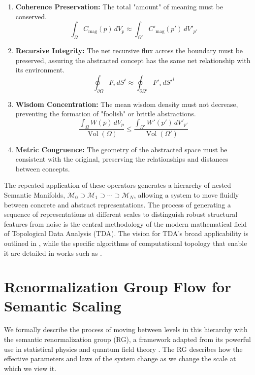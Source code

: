 \begin{enumerate}
    \item \textbf{Coherence Preservation:} The total "amount" of meaning must be conserved.
    \begin{equation}
    \int_{\Omega} C_{\text{mag}}(p) \, dV_p \approx \int_{\Omega'} C'_{\text{mag}}(p') \, dV'_{p'}
    \end{equation}
    \item \textbf{Recursive Integrity:} The net recursive flux across the boundary must be preserved, assuring the abstracted concept has the same net relationship with its environment.
    \begin{equation}
    \oint_{\partial \Omega} F_i \, dS^i \approx \oint_{\partial \Omega'} F'_i \, dS'^i
    \end{equation}
    \item \textbf{Wisdom Concentration:} The mean wisdom density must not decrease, preventing the formation of "foolish" or brittle abstractions.
    \begin{equation}
    \frac{\int_{\Omega} W(p) \, dV_p}{\operatorname{Vol}(\Omega)} \leq \frac{\int_{\Omega'} W'(p') \, dV'_{p'}}{\operatorname{Vol}(\Omega')}
    \end{equation}
    \item \textbf{Metric Congruence:} The geometry of the abstracted space must be consistent with the original, preserving the relationships and distances between concepts.
\end{enumerate}

The repeated application of these operators generates a hierarchy of nested Semantic Manifolds, \(\mathcal{M}_0 \supset \mathcal{M}_1 \supset \cdots \supset \mathcal{M}_N\), allowing a system to move fluidly between concrete and abstract representations. The process of generating a sequence of representations at different scales to distinguish robust structural features from noise is the central methodology of the modern mathematical field of Topological Data Analysis (TDA). The vision for TDA's broad applicability is outlined in \textcite{Carlsson2009}, while the specific algorithms of computational topology that enable it are detailed in works such as \textcite{EdelsbrunnerHarer2010}.

\section{Renormalization Group Flow for Semantic Scaling}

We formally describe the process of moving between levels in this hierarchy with the semantic renormalization group (RG), a framework adapted from its powerful use in statistical physics and quantum field theory \autocite{Wilson1971, Cardy1996}. The RG describes how the effective parameters and laws of the system change as we change the scale at which we view it.

